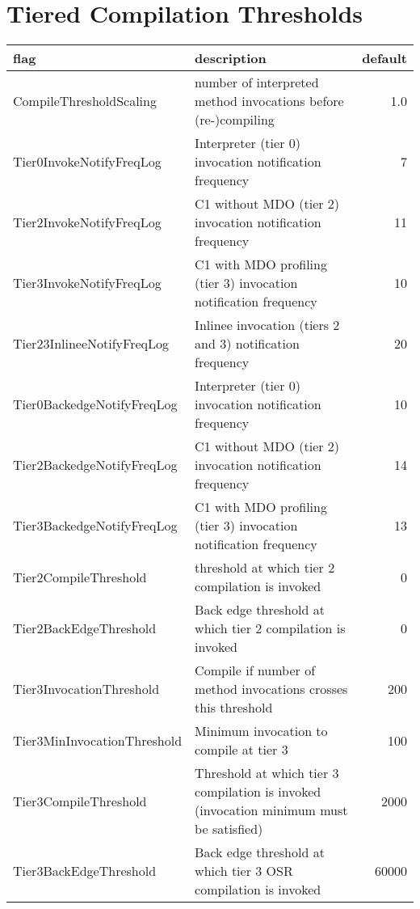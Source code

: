 \newpage
\section{Tiered Compilation Thresholds}
\label{a:compilethresholds}
\begin{table}[h]
  \centering
  \label{t:compilethresholds}
  \begin{center}
    \begin{tabular}{| l | p{9.0cm} | r | }
       \hline
       \textbf{flag} & \textbf{description} & \textbf{default} \\ \hline\hline
       CompileThresholdScaling & number of interpreted method invocations before (re-)compiling & 1.0\\ \hline
       Tier0InvokeNotifyFreqLog & Interpreter (tier 0) invocation notification frequency & 7\\ \hline
       Tier2InvokeNotifyFreqLog & C1 without MDO (tier 2) invocation notification frequency & 11 \\ \hline
       Tier3InvokeNotifyFreqLog & C1 with MDO profiling (tier 3) invocation notification frequency & 10 \\ \hline
       Tier23InlineeNotifyFreqLog & Inlinee invocation (tiers 2 and 3) notification frequency & 20 \\ \hline
       Tier0BackedgeNotifyFreqLog & Interpreter (tier 0) invocation notification frequency & 10 \\ \hline
       Tier2BackedgeNotifyFreqLog & C1 without MDO (tier 2) invocation notification frequency & 14 \\ \hline
       Tier3BackedgeNotifyFreqLog & C1 with MDO profiling (tier 3) invocation notification frequency & 13 \\ \hline
       Tier2CompileThreshold & threshold at which tier 2 compilation is invoked & 0 \\ \hline
       Tier2BackEdgeThreshold & Back edge threshold at which tier 2 compilation is invoked & 0 \\ \hline
       Tier3InvocationThreshold & Compile if number of method invocations crosses this threshold & 200 \\ \hline
       Tier3MinInvocationThreshold & Minimum invocation to compile at tier 3 & 100 \\ \hline
       Tier3CompileThreshold & Threshold at which tier 3 compilation is invoked (invocation minimum must be satisfied) & 2000 \\ \hline
       Tier3BackEdgeThreshold & Back edge threshold at which tier 3 OSR compilation is invoked & 60000 \\ \hline

\end{tabular}
\end{center}
\end{table}
